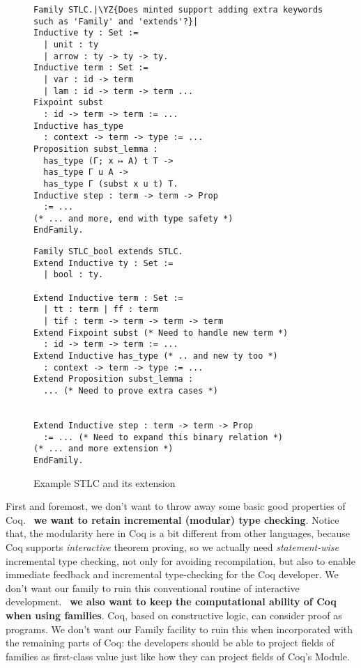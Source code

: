 \begin{figure}[!htb]
  \begin{minipage}[t]{0.47\linewidth}
\begin{verbatim}
Family STLC.|\YZ{Does minted support adding extra keywords such as 'Family' and 'extends'?}|
Inductive ty : Set :=
  | unit : ty
  | arrow : ty -> ty -> ty.
Inductive term : Set := 
  | var : id -> term 
  | lam : id -> term -> term ...
Fixpoint subst 
  : id -> term -> term := ...
Inductive has_type 
  : context -> term -> type := ...
Proposition subst_lemma :
  has_type (Γ; x ↦ A) t T ->
  has_type Γ u A ->
  has_type Γ (subst x u t) T.
Inductive step : term -> term -> Prop 
  := ...
(* ... and more, end with type safety *)
EndFamily.
\end{verbatim}
  \end{minipage}
  \begin{minipage}[t]{0.47\linewidth}
\begin{verbatim}
Family STLC_bool extends STLC.
Extend Inductive ty : Set :=
  | bool : ty.

Extend Inductive term : Set := 
  | tt : term | ff : term 
  | tif : term -> term -> term -> term
Extend Fixpoint subst (* Need to handle new term *)
  : id -> term -> term := ...
Extend Inductive has_type (* .. and new ty too *)
  : context -> term -> type := ...
Extend Proposition subst_lemma :
  ... (* Need to prove extra cases *)


Extend Inductive step : term -> term -> Prop 
  := ... (* Need to expand this binary relation *)
(* ... and more extension *)
EndFamily.
\end{verbatim}
  \end{minipage}
  \caption{Example STLC and its extension}\label{fig:STLC-example}
\end{figure}



First and foremost, we don't want to throw away some basic good
properties of Coq. ~\textbf{we
want to retain incremental (modular) type checking}. Notice that, the
modularity here in Coq is a bit different from other languages, because
Coq supports \textit{interactive} theorem proving, so we actually need
\textit{statement-wise} incremental type checking, not only for avoiding
re\-compilation, but also to enable immediate feedback and incremental
type-checking for the Coq developer. We don't want our family to ruin
this conventional routine of interactive development.
~\textbf{we also want to keep the
computational ability of Coq when using families}. Coq, based on constructive
logic, can consider proof as programs. 
We don't want our Family facility to ruin this when incorporated with 
the remaining parts of Coq: 
the developers should be able to project fields of families 
as first-class value just like how they can project fields of Coq's Module.

